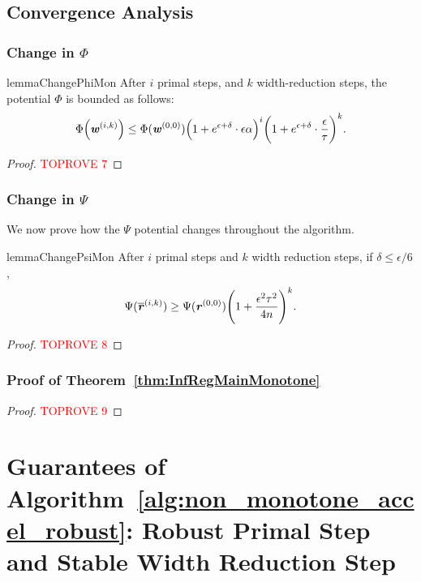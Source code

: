 \documentclass[11pt]{article}
\let\originalleft\left
\let\originalright\right
\renewcommand{\left}{\mathopen{}\mathclose\bgroup\originalleft}
\renewcommand{\right}{\aftergroup\egroup\originalright}
\newcommand\rr{\boldsymbol{\mathit{r}}}
\newcommand\ww{\boldsymbol{\mathit{w}}}
\newcommand\rrbar{\overline{\boldsymbol{\mathit{r}}}}
\begin{document}
\subsection*{Convergence Analysis}

\subsubsection*{Change in $\Phi$}

\begin{restatable}{lemma}{ChangePhiMon}
  \label{lem:ChangePhiMon}
  After $i$ primal steps, and $k$ width-reduction steps,
  the potential $\Phi$ is bounded as follows:
  \begin{align*}
 \Phi\left(\ww^{(i,k)}\right) \leq \Phi(\ww^{(0,0)})\left(1+e^{\epsilon + \delta} \cdot \epsilon\alpha\right)^i \left(1+ e^{\epsilon + \delta} \cdot \frac{\epsilon}{\tau} \right)^k .
 \end{align*}
\end{restatable}
\begin{proof}\textcolor{red}{TOPROVE 7}\end{proof}


\subsubsection*{Change in $\Psi$}


We now prove how the $\Psi$ potential changes throughout the algorithm.
\begin{restatable}{lemma}{ChangePsiMon}
\label{lem:ChangePsiMon}
After $i$ primal steps and $k$ width reduction steps, if $\delta \leq \epsilon/6$,
\[
\Psi(\rrbar^{(i,k)})\geq \Psi(\rr^{(0,0)})\left(1  +\frac{\epsilon^2\tau^2}{4  n}\right)^k.
\]

\end{restatable}
\begin{proof}\textcolor{red}{TOPROVE 8}\end{proof}


\subsubsection*{Proof of Theorem~\ref{thm:InfRegMainMonotone}}
\begin{proof}\textcolor{red}{TOPROVE 9}\end{proof}


 \section{Guarantees of Algorithm~\ref{alg:non_monotone_accel_robust}: Robust Primal Step and Stable Width Reduction Step}\label{sec:Appendix_non_monotone_robust}
\end{document}

